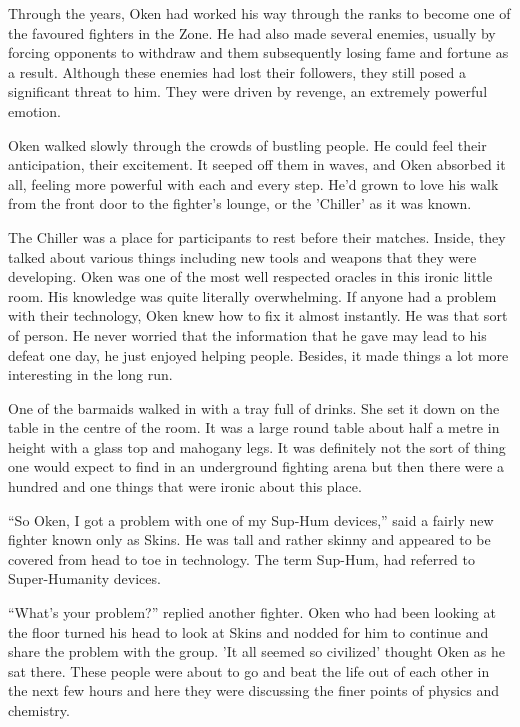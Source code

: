 Through the years, Oken had worked his way through the ranks to become one of the favoured fighters in the Zone.  He had also made several enemies, usually by forcing opponents to withdraw and them subsequently losing fame and fortune as a result.  Although these enemies had lost their followers, they still posed a significant threat to him.  They were driven by revenge, an extremely powerful emotion.  

Oken walked slowly through the crowds of bustling people.  He could feel their anticipation, their excitement.  It seeped off them in waves, and Oken absorbed it all, feeling more powerful with each and every step.  He'd grown to love his walk from the front door to the fighter's lounge, or the 'Chiller' as it was known.  

The Chiller was a place for participants to rest before their matches.  Inside, they talked about various things including new tools and weapons that they were developing.  Oken was one of the most well respected oracles in this ironic little room.  His knowledge was quite literally  overwhelming.  If anyone had a problem with their technology, Oken knew how to fix it almost instantly.  He was that sort of person.  He never worried that the information that he gave may lead to his defeat one day, he just enjoyed helping people.  Besides, it made things a lot more interesting in the long run.

One of the barmaids walked in with a tray full of drinks.  She set it down on the table in the centre of the room.  It was a large round table about half a metre in height with a glass top and mahogany legs.  It was definitely not the sort of thing one would expect to find in an underground fighting arena but then there were a hundred and one things that were ironic about this place.  

``So Oken, I got a problem with one of my Sup-Hum devices,'' said a fairly new fighter known only as Skins.  He was tall and rather skinny and appeared to be covered from head to toe in technology.  The term Sup-Hum, had referred to Super-Humanity devices.  

``What's your problem?'' replied another fighter.  Oken who had been looking at the floor turned his head to look at Skins and nodded for him to continue and share the problem with the group.  'It all seemed so civilized' thought Oken as he sat there.  These people were about to go and beat the life out of each other in the next few hours and here they were discussing the finer points of physics and chemistry.

